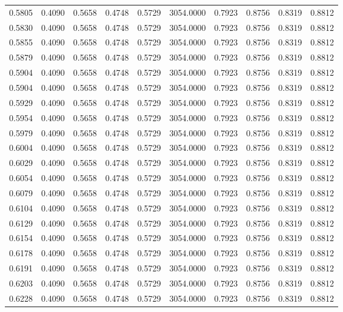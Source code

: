 \begin{tabular}{rrrrrrrrrr}
0.5805 & 0.4090 & 0.5658 & 0.4748 & 0.5729 & 3054.0000 & 0.7923 & 0.8756 & 0.8319 & 0.8812 \\
0.5830 & 0.4090 & 0.5658 & 0.4748 & 0.5729 & 3054.0000 & 0.7923 & 0.8756 & 0.8319 & 0.8812 \\
0.5855 & 0.4090 & 0.5658 & 0.4748 & 0.5729 & 3054.0000 & 0.7923 & 0.8756 & 0.8319 & 0.8812 \\
0.5879 & 0.4090 & 0.5658 & 0.4748 & 0.5729 & 3054.0000 & 0.7923 & 0.8756 & 0.8319 & 0.8812 \\
0.5904 & 0.4090 & 0.5658 & 0.4748 & 0.5729 & 3054.0000 & 0.7923 & 0.8756 & 0.8319 & 0.8812 \\
0.5904 & 0.4090 & 0.5658 & 0.4748 & 0.5729 & 3054.0000 & 0.7923 & 0.8756 & 0.8319 & 0.8812 \\
0.5929 & 0.4090 & 0.5658 & 0.4748 & 0.5729 & 3054.0000 & 0.7923 & 0.8756 & 0.8319 & 0.8812 \\
0.5954 & 0.4090 & 0.5658 & 0.4748 & 0.5729 & 3054.0000 & 0.7923 & 0.8756 & 0.8319 & 0.8812 \\
0.5979 & 0.4090 & 0.5658 & 0.4748 & 0.5729 & 3054.0000 & 0.7923 & 0.8756 & 0.8319 & 0.8812 \\
0.6004 & 0.4090 & 0.5658 & 0.4748 & 0.5729 & 3054.0000 & 0.7923 & 0.8756 & 0.8319 & 0.8812 \\
0.6029 & 0.4090 & 0.5658 & 0.4748 & 0.5729 & 3054.0000 & 0.7923 & 0.8756 & 0.8319 & 0.8812 \\
0.6054 & 0.4090 & 0.5658 & 0.4748 & 0.5729 & 3054.0000 & 0.7923 & 0.8756 & 0.8319 & 0.8812 \\
0.6079 & 0.4090 & 0.5658 & 0.4748 & 0.5729 & 3054.0000 & 0.7923 & 0.8756 & 0.8319 & 0.8812 \\
0.6104 & 0.4090 & 0.5658 & 0.4748 & 0.5729 & 3054.0000 & 0.7923 & 0.8756 & 0.8319 & 0.8812 \\
0.6129 & 0.4090 & 0.5658 & 0.4748 & 0.5729 & 3054.0000 & 0.7923 & 0.8756 & 0.8319 & 0.8812 \\
0.6154 & 0.4090 & 0.5658 & 0.4748 & 0.5729 & 3054.0000 & 0.7923 & 0.8756 & 0.8319 & 0.8812 \\
0.6178 & 0.4090 & 0.5658 & 0.4748 & 0.5729 & 3054.0000 & 0.7923 & 0.8756 & 0.8319 & 0.8812 \\
0.6191 & 0.4090 & 0.5658 & 0.4748 & 0.5729 & 3054.0000 & 0.7923 & 0.8756 & 0.8319 & 0.8812 \\
0.6203 & 0.4090 & 0.5658 & 0.4748 & 0.5729 & 3054.0000 & 0.7923 & 0.8756 & 0.8319 & 0.8812 \\
0.6228 & 0.4090 & 0.5658 & 0.4748 & 0.5729 & 3054.0000 & 0.7923 & 0.8756 & 0.8319 & 0.8812 \\

\end{tabular}
